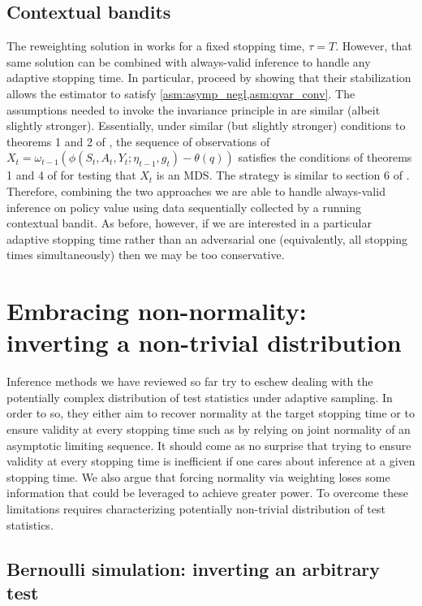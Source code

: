 \subsection{Contextual bandits}\label{sec: cb anytime}

The reweighting solution in \citet{bibaut2021post} works for a fixed stopping time, $\tau=T$. However, that same solution can be combined with always-valid inference to handle any adaptive stopping time. In particular, \citet{bibaut2021post} proceed by showing that their stabilization allows the estimator to satisfy \cref{asm:asymp_negl,asm:qvar_conv}. The assumptions needed to invoke the invariance principle in \citet{bibaut2022near} are similar (albeit slightly stronger). Essentially, under similar (but slightly stronger) conditions to theorems 1 and 2 of \citet{bibaut2021post}, the sequence of observations of $X_t=\omega_{t-1}(\phi(S_t,A_t,Y_t;\eta_{t-1},g_t)-\theta(q))$ satisfies the conditions of theorems 1 and 4 of \citet{bibaut2022near} for testing that $X_t$ is an MDS. The strategy is similar to section 6 of \citet{bibaut2022near}. Therefore, combining the two approaches we are able to handle always-valid inference on policy value using data sequentially collected by a running contextual bandit. As before, however, if we are interested in a particular adaptive stopping time rather than an adversarial one (equivalently, all stopping times simultaneously) then we may be too conservative.


\section{Embracing non-normality: inverting a non-trivial distribution}\label{sec: non-normal}

Inference methods we have reviewed so far try to eschew dealing with the potentially complex distribution of test statistics under adaptive sampling. In order to so, they either aim to recover normality at the target stopping time or to ensure validity at every stopping time such as by relying on joint normality of an asymptotic limiting sequence. It should come as no surprise that trying to ensure validity at every stopping time is inefficient if one cares about inference at a given stopping time. We also argue that forcing normality via weighting loses some information that could be leveraged to achieve greater power. To overcome these limitations requires characterizing potentially non-trivial distribution of test statistics.

\subsection{Bernoulli simulation: inverting an arbitrary test}\label{sec:bernoulli_sim}

